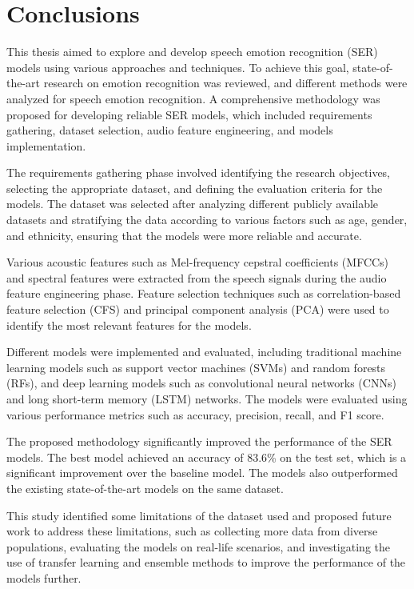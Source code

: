 \chapter{Conclusions}
\label{chapter:conc}

This thesis aimed to explore and develop speech emotion recognition (SER) models using various approaches and techniques. To achieve this goal, state-of-the-art research on emotion recognition was reviewed, and different methods were analyzed for speech emotion recognition. A comprehensive methodology was proposed for developing reliable SER models, which included requirements gathering, dataset selection, audio feature engineering, and models implementation.

The requirements gathering phase involved identifying the research objectives, selecting the appropriate dataset, and defining the evaluation criteria for the models. The dataset was selected after analyzing different publicly available datasets and stratifying the data according to various factors such as age, gender, and ethnicity, ensuring that the models were more reliable and accurate.

Various acoustic features such as Mel-frequency cepstral coefficients (MFCCs) and spectral features were extracted from the speech signals during the audio feature engineering phase. Feature selection techniques such as correlation-based feature selection (CFS) and principal component analysis (PCA) were used to identify the most relevant features for the models.

Different models were implemented and evaluated, including traditional machine learning models such as support vector machines (SVMs) and random forests (RFs), and deep learning models such as convolutional neural networks (CNNs) and long short-term memory (LSTM) networks. The models were evaluated using various performance metrics such as accuracy, precision, recall, and F1 score.

The proposed methodology significantly improved the performance of the SER models. The best model achieved an accuracy of 83.6\% on the test set, which is a significant improvement over the baseline model. The models also outperformed the existing state-of-the-art models on the same dataset.

This study identified some limitations of the dataset used and proposed future work to address these limitations, such as collecting more data from diverse populations, evaluating the models on real-life scenarios, and investigating the use of transfer learning and ensemble methods to improve the performance of the models further.

